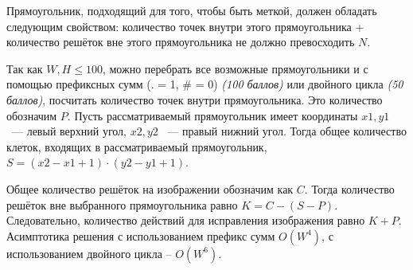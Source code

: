 \solutionSection

Прямоугольник, подходящий для того, чтобы быть меткой, должен обладать следующим свойством: количество точек внутри этого прямоугольника + количество решёток вне этого прямоугольника не должно превосходить $N$.

Так как $W, H \le 100$, можно перебрать все возможные прямоугольники и с помощью префиксных сумм (. = 1, \# = 0) \textit{(100 баллов)}  или двойного цикла \textit{(50 баллов)}, посчитать количество точек внутри прямоугольника. Это количество обозначим $P$. Пусть рассматриваемый прямоугольник имеет координаты $x1, y1$ ~--- левый верхний угол, $x2, y2$ ~--- правый нижний угол. Тогда общее количество клеток, входящих в рассматриваемый прямоугольник, $S = (x2 - x1 + 1) \cdot (y2 - y1 + 1)$.

Общее количество решёток на изображении обозначим как $C$. Тогда количество решёток вне выбранного прямоугольника равно $K = C - (S - P)$. Следовательно, количество действий для исправления изображения равно $K + P$. Асимптотика решения с использованием префикс сумм $O(W^4)$, с использованием двойного цикла -- $O(W^6)$.

\codeExample

